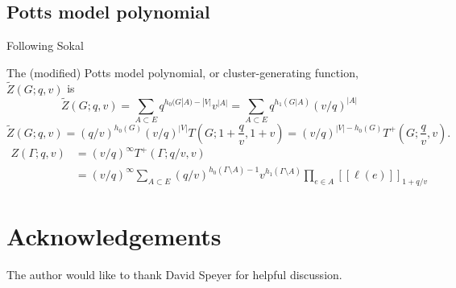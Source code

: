 \documentclass{amsart}
\theoremstyle{definition}
\newcommand{\fanalog}[2]{[\![#2]\!]_{#1}}
\begin{document}
\subsection{Potts model polynomial}

Following Sokal~\cite[Section 2.5]{Sok-potts}

The (modified) Potts model polynomial, or cluster-generating function, $\widetilde Z(G; q,v)$ is
\[
	\widetilde Z(G; q, v) = \sum_{A \subset E} q^{h_0(G|A) - |V|} v^{|A|}
	= \sum_{A \subset E} q^{h_1(G|A)} (v/q)^{|A|}
\]
\[
	\widetilde Z(G; q,v) = (q/v)^{h_0(G)} (v/q)^{|V|} T(G; 1 + \frac{q}{v}, 1 + v) 
	= (v/q)^{|V| - h_0(G)} T^+(G; \frac{q}{v}, v) .
\]
\begin{align*}
	Z(\Gamma; q, v) &= (v/q)^{\infty} T^+(\Gamma; q/v, v) \\
	&= (v/q)^{\infty} \sum_{A \subset E} (q/v)^{h_0(\Gamma \setminus A) - 1} v^{h_1(\Gamma \setminus A)} \prod_{e \in A} \fanalog{1 + q/v}{\ell(e)}
\end{align*}

\section*{Acknowledgements}
The author would like to thank David Speyer for helpful discussion.


 

\end{document}
